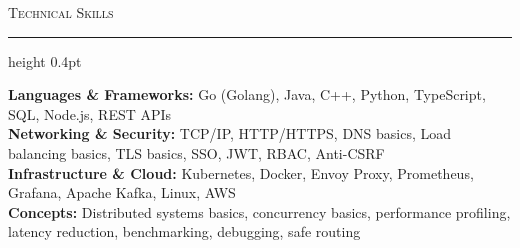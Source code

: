 \documentclass[letterpaper,11pt]{article}
\newcommand{\resumesection}[1]{%
  \par\vspace{2pt}%
  {\large\scshape #1}\par\vspace{2pt}%
  \hrule height 0.4pt\vspace{2pt}%
}
\begin{document}
\resumesection{Technical Skills}
\textbf{Languages \& Frameworks:} Go (Golang), Java, C++, Python, TypeScript, SQL, Node.js, REST APIs\\
\textbf{Networking \& Security:} TCP/IP, HTTP/HTTPS, DNS basics, Load balancing basics, TLS basics, SSO, JWT, RBAC, Anti-CSRF\\
\textbf{Infrastructure \& Cloud:} Kubernetes, Docker, Envoy Proxy, Prometheus, Grafana, Apache Kafka, Linux, AWS\\
\textbf{Concepts:} Distributed systems basics, concurrency basics, performance profiling, latency reduction, benchmarking, debugging, safe routing
\end{document}
